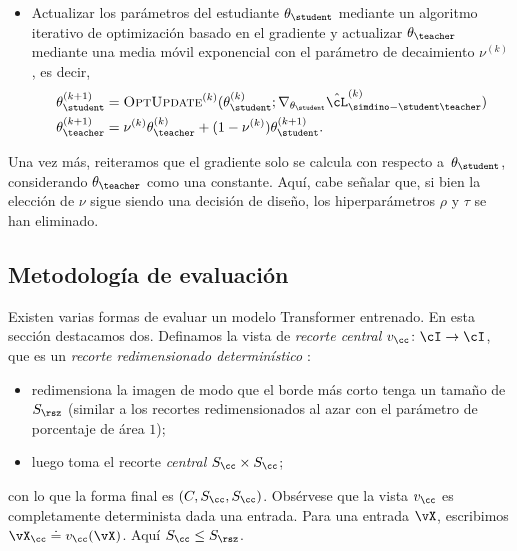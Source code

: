 \documentclass[../../book-main_es.tex]{subfiles}
\begin{document}
\begin{itemize}
    donde \(R_{\eps}\) es la tasa de codificación gaussiana estimada a partir de
    muestras finitas, tal como se describe en . El
    gradiente de \(\hat{\cL}_{\simdino-\student\teacher}^{(k)}\) con
    respecto a \(\theta_{\student}\) debe calcularse nuevamente,
    bajo el supuesto de que \(\theta_{\teacher}\) permanece constante.
\item Actualizar los parámetros del estudiante \(\theta_{\student}\) mediante un
    algoritmo iterativo de optimización basado en el gradiente y actualizar
    \(\theta_{\teacher}\) mediante una media móvil exponencial con
    el parámetro de decaimiento \(\nu^{(k)}\), es decir,
    \begin{align}
        \theta_{\student}^{(k + 1)}
        &= \textsc{OptUpdate}^{(k)}(\theta_{\student}^{(k)};
        \nabla_{\theta_{\student}}\hat{\cL}_{\simdino-\student\teacher}^{(k)})
        \\
        \theta_{\teacher}^{(k + 1)}
        &= \nu^{(k)}\theta_{\teacher}^{(k)} + (1 -
        \nu^{(k)})\theta_{\student}^{(k + 1)}.
    \end{align}
\end{itemize}
Una vez más, reiteramos que el gradiente solo se calcula
con respecto a~\(\theta_{\student}\), considerando \(\theta_{\teacher}\) como una
constante. Aquí, cabe señalar que, si bien la elección de \(\nu\) sigue siendo una
decisión de diseño, los hiperparámetros \(\rho\) y \(\tau\) se han eliminado.

\subsection{Metodología de evaluación}\label{sub:contrastive_learning_evals}
Existen varias formas de evaluar un modelo Transformer entrenado. En
esta sección destacamos dos. Definamos la vista de \textit{recorte central}
\(v_{\cc} \colon \cI \to \cI\), que es un \textit{recorte redimensionado determinístico
}:
\begin{itemize}
\item redimensiona la imagen de modo que el borde más corto tenga un tamaño de
    \(S_{\rsz}\) (similar a los recortes redimensionados al azar con el parámetro de porcentaje de área
    \(1\));
\item luego toma el recorte \textit{central} \(S_{\cc} \times S_{\cc}\);
\end{itemize}
con lo que la forma final es \((C, S_{\cc}, S_{\cc})\). Obsérvese que la
vista \(v_{\cc}\) es completamente determinista dada una entrada. Para una
entrada \(\vX\), escribimos \(\vX_{\cc} \doteq v_{\cc}(\vX)\). Aquí
\(S_{\cc} \leq S_{\rsz}\).
\end{document}
